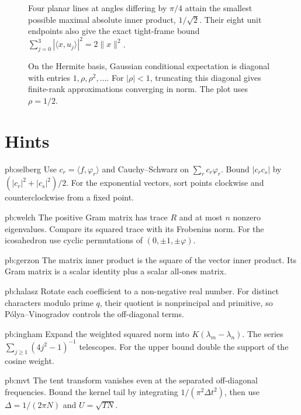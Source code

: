 \begin{figure}[ht]
\centering{}
\caption{Four planar lines at angles differing by $\pi/4$ attain the smallest possible maximal absolute inner product, $1/\sqrt2$. Their eight unit endpoints also give the exact tight-frame bound $\sum_{j=0}^3|\langle x,u_j\rangle|^2=2\|x\|^2$.}
\label{fig:v8c16frame}
\end{figure}
\begin{figure}[ht]
\centering{}
\caption{On the Hermite basis, Gaussian conditional expectation is diagonal with entries $1,\rho,\rho^2,\ldots$. For $|\rho|<1$, truncating this diagonal gives finite-rank approximations converging in norm. The plot uses $\rho=1/2$.}
\label{fig:v8c16gaussian}
\end{figure}
\section*{Hints}
\begin{hint}{pb:selberg}
Use $c_r=\langle f,\varphi_r\rangle$ and Cauchy--Schwarz on $\sum_rc_r\varphi_r$. Bound $|c_rc_s|$ by $(|c_r|^2+|c_s|^2)/2$. For the exponential vectors, sort points clockwise and counterclockwise from a fixed point.
\end{hint}
\begin{hint}{pb:welch}
The positive Gram matrix has trace $R$ and at most $n$ nonzero eigenvalues. Compare its squared trace with its Frobenius norm. For the icosahedron use cyclic permutations of $(0,\pm1,\pm\varphi)$.
\end{hint}
\begin{hint}{pb:gerzon}
The matrix inner product is the square of the vector inner product. Its Gram matrix is a scalar identity plus a scalar all-ones matrix.
\end{hint}
\begin{hint}{pb:halasz}
Rotate each coefficient to a non-negative real number. For distinct characters modulo prime $q$, their quotient is nonprincipal and primitive, so Pólya--Vinogradov controls the off-diagonal terms.
\end{hint}
\begin{hint}{pb:ingham}
Expand the weighted squared norm into $K(\lambda_m-\lambda_n)$. The series $\sum_{j\ge1}(4j^2-1)^{-1}$ telescopes. For the upper bound double the support of the cosine weight.
\end{hint}
\begin{hint}{pb:mvt}
The tent transform vanishes even at the separated off-diagonal frequencies. Bound the kernel tail by integrating $1/(\pi^2\Delta t^2)$, then use $\Delta=1/(2\pi N)$ and $U=\sqrt{TN}$.
\end{hint}
